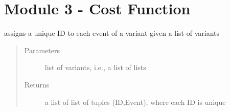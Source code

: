 \documentclass[letterpaper,10pt,english]{sphinxmanual}
\begin{document}
{\hyperref[\detokenize{index:mastertoc}]{}}


\chapter{Module 3 - Cost Function}
\label{\detokenize{cost function:module-3-cost-function}}\label{\detokenize{cost function::doc}}
\begin{DUlineblock}{0em}
\item[] 
\end{DUlineblock}

\begin{fulllineitems}
\label{\detokenize{cost function:costFunction.mappings.createEventIDs}}
assigns a unique ID to each event of a variant given a list of variants
\begin{quote}\begin{description}
\item[{Parameters}] \leavevmode
{} \textendash{} list of variants, i.e., a list of lists

\item[{Returns}] \leavevmode
a list of list of tuples (ID,Event), where each ID is unique

\end{description}\end{quote}

\end{fulllineitems}

\end{document}
